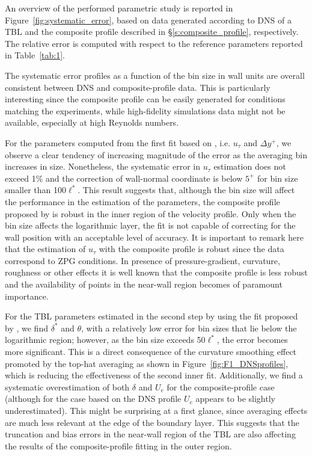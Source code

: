 An overview of the performed parametric study is reported in Figure~\ref{fig:systematic_error}, based on data generated according to DNS of a TBL and the composite profile described in \S\ref{s:composite_profile}, respectively. The relative error is computed with respect to the reference parameters reported in Table~\ref{tab:1}.

The systematic error {profiles as a function of the bin size in wall units} are overall consistent between DNS and composite-profile data. This is particularly interesting since the composite profile can be easily generated for conditions matching the experiments, while high-fidelity simulations data might not be available, especially at high Reynolds numbers.

For the parameters computed from the first fit based on \citet{Chauhan:2009p10824}, i.e. $u_\tau$ and $\Delta y^+$, we observe a clear tendency of increasing magnitude of the error as the averaging bin increases in size. Nonetheless, the systematic error in $u_\tau$ estimation does not exceed 1\% and the correction of wall-normal coordinate is below $5^+$ for bin size smaller than {100}$\ell^*$. This result {suggests} that, although the bin size will affect the performance in the estimation of the parameters, the composite profile proposed by \citet{Chauhan:2009p10824} is robust in the inner region of the velocity profile. Only when the bin size affects the logarithmic layer, the fit is not capable of correcting for the wall position with an acceptable level of accuracy. {It is important to remark here that the estimation of $u_\tau$ with the composite profile is robust since the data correspond to ZPG conditions. In presence of pressure-gradient, curvature, roughness or other effects it is well known that the composite profile is less robust and the availability of points in the near-wall region becomes of paramount importance.} 

For the TBL parameters estimated in the second step by using the fit proposed by \citet{Nickels:2004p15662}, we find $\delta^*$ and $\theta$, with a relatively low error for {bin} sizes that lie below the logarithmic region; however, as the bin size exceeds 50$\ell^*$, the error becomes more significant. This is a direct consequence of the curvature smoothing effect promoted by the top-hat averaging as shown in Figure~\ref{fig:F1_DNSprofiles}, which is reducing the effectiveness of the second {inner} fit. Additionally, we find a systematic overestimation of both $\delta$ and $U_e$ {for the composite-profile case (although for the case based on the DNS profile $U_e$ appears to be slightly underestimated)}. This might be surprising at a first glance, since averaging effects are much less relevant at the edge of the boundary layer. This suggests that the truncation and bias errors in the near-wall region of the TBL are also affecting the results of the composite-profile fitting in the outer region. 


